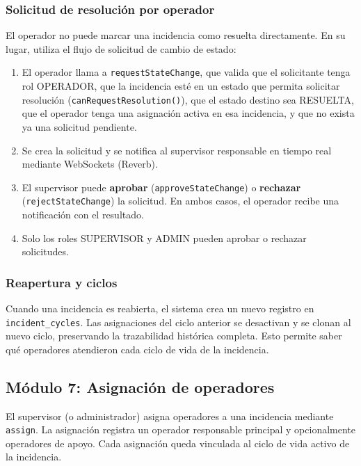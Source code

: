 \documentclass[12pt,a4paper]{article}
\begin{document}
\subsubsection*{Solicitud de resolución por operador}

El operador no puede marcar una incidencia como resuelta directamente. En su lugar,
utiliza el flujo de solicitud de cambio de estado:
\begin{enumerate}
    \item El operador llama a \texttt{requestStateChange}, que valida que el
          solicitante tenga rol OPERADOR, que la incidencia esté en un estado que
          permita solicitar resolución (\texttt{canRequestResolution()}), que el
          estado destino sea RESUELTA, que el operador tenga una asignación activa
          en esa incidencia, y que no exista ya una solicitud pendiente.
    \item Se crea la solicitud y se notifica al supervisor responsable en tiempo
          real mediante WebSockets (Reverb).
    \item El supervisor puede \textbf{aprobar} (\texttt{approveStateChange}) o
          \textbf{rechazar} (\texttt{rejectStateChange}) la solicitud. En ambos
          casos, el operador recibe una notificación con el resultado.
    \item Solo los roles SUPERVISOR y ADMIN pueden aprobar o rechazar solicitudes.
\end{enumerate}

\subsubsection*{Reapertura y ciclos}

Cuando una incidencia es reabierta, el sistema crea un nuevo registro en
\texttt{incident\_cycles}. Las asignaciones del ciclo anterior se desactivan y se
clonan al nuevo ciclo, preservando la trazabilidad histórica completa. Esto
permite saber qué operadores atendieron cada ciclo de vida de la incidencia.

\subsection{Módulo 7: Asignación de operadores}

El supervisor (o administrador) asigna operadores a una incidencia mediante
\texttt{assign}. La asignación registra un operador responsable principal y
opcionalmente operadores de apoyo. Cada asignación queda vinculada al ciclo
de vida activo de la incidencia.
\end{document}
